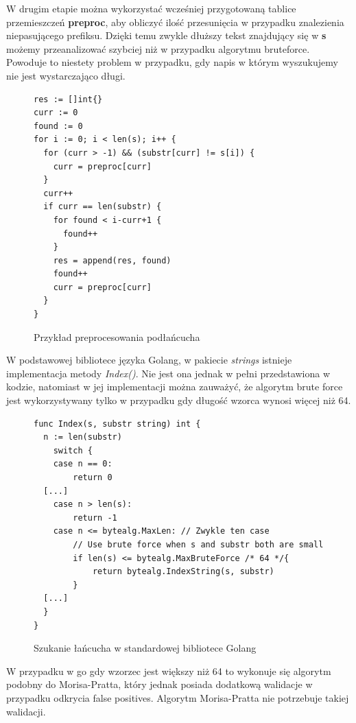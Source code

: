 W drugim etapie można wykorzystać wcześniej przygotowaną tablice przemieszczeń 
\textbf{preproc}, aby obliczyć ilość przesunięcia w przypadku znalezienia 
niepasującego prefiksu. Dzięki temu zwykle dłuższy tekst znajdujący się w 
\textbf{s} możemy przeanalizować szybciej niż w przypadku algorytmu bruteforce.
Powoduje to niestety problem w przypadku, gdy napis w którym wyszukujemy nie 
jest wystarczająco długi.

\begin{figure}[h]
  \centering
  \begin{lstlisting}
res := []int{}
curr := 0
found := 0
for i := 0; i < len(s); i++ {
  for (curr > -1) && (substr[curr] != s[i]) {
    curr = preproc[curr]
  }
  curr++
  if curr == len(substr) {
    for found < i-curr+1 {
      found++
    }
    res = append(res, found)
    found++
    curr = preproc[curr]
  }
}
  \end{lstlisting}
  \caption{Przykład preprocesowania podłańcucha }
  \label{fig:code:preprocessMorisPratt}
\end{figure}

W podstawowej bibliotece języka Golang, w pakiecie \textit{strings} istnieje 
implementacja metody \textit{Index()}. Nie jest ona jednak w pełni przedstawiona
w kodzie, natomiast w jej implementacji można zauważyć, że algorytm brute force
jest wykorzystywany tylko w przypadku gdy długość wzorca wynosi więcej niż 64.

\begin{figure}[h]
  \centering
  \begin{lstlisting}
func Index(s, substr string) int {
  n := len(substr)
	switch {
	case n == 0:
		return 0
  [...]
	case n > len(s):
		return -1
	case n <= bytealg.MaxLen: // Zwykle ten case
		// Use brute force when s and substr both are small
		if len(s) <= bytealg.MaxBruteForce /* 64 */{
			return bytealg.IndexString(s, substr)
		}
  [...]
  }
}
  \end{lstlisting}
  \caption{ Szukanie łańcucha w standardowej bibliotece Golang }
  \label{fig:code:preprocessMorisPratt}
\end{figure}

W przypadku w go gdy wzorzec jest większy niż 64 to wykonuje się algorytm 
podobny do Morisa-Pratta, który jednak posiada dodatkową walidacje w przypadku
odkrycia false positives. Algorytm Morisa-Pratta nie potrzebuje takiej walidacji.
